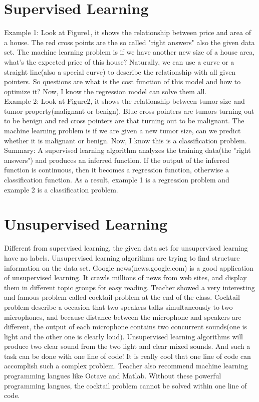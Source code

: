 \documentclass{article}
\begin{document}
\section{Supervised Learning}
Example 1: Look at Figure1, it shows the relationship between price and area of a house. The red cross points are the so called "right answers" also the given data set. The machine learning problem is if we have another new size of a house area, what's the expected price of this house? Naturally, we can use a curve or a straight line(also a special curve) to describe the relationship with all given pointers. So questions are what is the cost function of this model and how to optimize it? Now, I know the regression model can solve them all.\\
Example 2: Look at Figure2, it shows the relationship between tumor size and tumor property(malignant or benign). Blue cross pointers are tumors turning out to be benign and red cross pointers are that turning out to be malignant. The machine learning problem is if we are given a new tumor size, can we predict whether it is malignant or benign. Now, I know this is a classification problem.\\
Summary: A supervised learning algorithm analyzes the training data(the "right answers") and produces an inferred function. If the output of the inferred function is continuous, then it becomes a regression function, otherwise a classification function. As a result, example 1 is a regression problem and example 2 is a classification problem.

\section{Unsupervised Learning}
Different from supervised learning, the given data set for unsupervised learning have no labels. Unsupervised learning algorithms are trying to find structure information on the data set. Google news(news.google.com) is a good application of unsupervised learning. It crawls millions of news from web sites, and display them in different topic groups for easy reading. Teacher showed a very interesting and famous problem called cocktail problem at the end of the class. Cocktail problem describe a occasion that two speakers talks simultaneously to two microphones, and because distance between the microphone and speakers are different, the output of each microphone contains two concurrent sounds(one is light and the other one is clearly loud). Unsupervised learning algorithms will produce two clear sound from the two light and clear mixed sounds. And such a task can be done with one line of code! It is really cool that one line of code can accomplish such a complex problem. Teacher also recommend machine learning programming langues like Octave and Matlab. Without these powerful programming langues, the cocktail problem cannot be solved within one line of code. 
\end{document}
